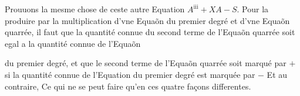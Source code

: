 \documentclass[11pt,a4paper]{article}
\begin{document}
Prouuons la mesme chose de ceste autre Equation $A^{\mathrm{iii}} + XA - S$. Pour la produire par la multiplication d'vne Equaõn du premier degré et d'vne Equaõn quarrée, il faut que la quantité connue du second terme de \struck{\ill{}} l'Equaõn quarrée soit egal a la quantité connue de l'Equaõn


du premier degré, et que le second terme de l'Equaõn quarrée soit marqué par $+$ si la quantité connue de l'Equation du premier degré est marquée par $-$ Et au contraire, Ce qui ne se peut faire qu'en ces quatre façons differentes.
\end{document}
